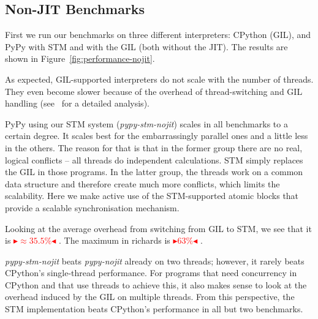 \documentclass{sigplanconf}
\newcommand{\mynote}[2]{%
  \textcolor{red}{%
    \fbox{\bfseries\sffamily\scriptsize#1}%
    {\small$\blacktriangleright$\textsf{\emph{#2}}$\blacktriangleleft$}%
  }%
}
\newcommand\remi[1]{\mynote{Remi}{#1}}
\begin{document}







\subsection{Non-JIT Benchmarks}
First we run our benchmarks on three different interpreters: CPython
(GIL), and PyPy with STM and with the GIL (both without the JIT). The
results are shown in Figure~\ref{fig:performance-nojit}.

As expected, GIL-supported interpreters do not scale with the number
of threads. They even become slower because of the overhead of
thread-switching and GIL handling (see~\cite{beazley10} for a detailed
analysis).

PyPy using our STM system (\emph{pypy-stm-nojit}) scales in all
benchmarks to a certain degree. It scales best for the embarrassingly
parallel ones and a little less in the others. The reason
for that is that in the former group there are no real, logical
conflicts -- all threads do independent calculations. STM simply
replaces the GIL in those programs. In the latter group,
the threads work on a common data structure and therefore
create much more conflicts, which limits the scalability. Here
we make active use of the STM-supported atomic blocks that
provide a scalable synchronisation mechanism.

Looking at the average overhead from switching from GIL to STM, we see
that it is \remi{$\approx 35.5\%$}. The maximum in richards is
\remi{$63\%$}.

\emph{pypy-stm-nojit} beats \emph{pypy-nojit} already on two threads;
however, it rarely beats CPython's single-thread performance.  For
programs that need concurrency in CPython and that use threads to
achieve this, it also makes sense to look at the overhead induced by
the GIL on multiple threads. From this perspective, the STM
implementation beats CPython's performance in all but two benchmarks.
\end{document}
